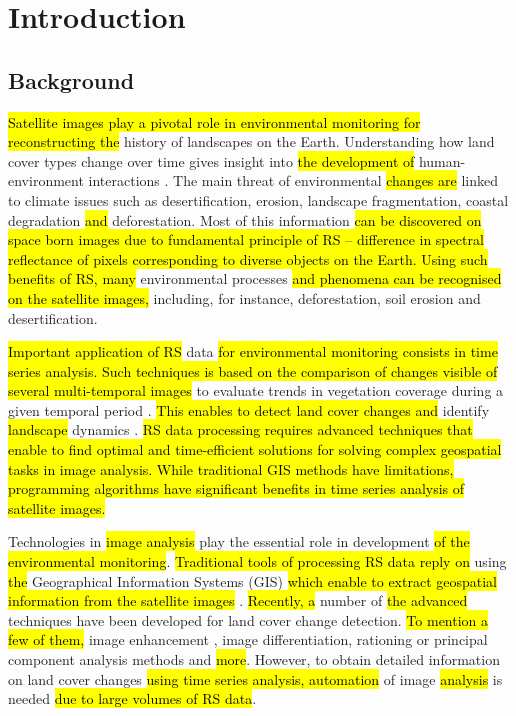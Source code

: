 \documentclass[jimaging,article,submit,pdftex,moreauthors]{Definitions/mdpi}
\begin{document}
\section{Introduction}

\subsection{Background}

\hl{Satellite images play a pivotal role in environmental monitoring for reconstructing the} history of landscapes\hl{ }\hl{ }on the Earth. Understanding how land cover types change over time gives\hl{ }insight into \hl{the development of }human-environment interactions \cite{Ndehedehe2022,Foli,Speranza}. The main threat of environmental \hl{changes are} linked to climate issues such as desertification, erosion, landscape fragmentation, coastal degradation \hl{and} deforestation. Most of this information \hl{can be discovered on space born images due to fundamental principle of RS -- difference in spectral reflectance of pixels corresponding to diverse objects on the Earth. Using such benefits of RS, many} environmental processes\hl{ and phenomena can be recognised on the satellite images,} including, for instance, deforestation, soil erosion and desertification. 

\hl{Important application of RS} data \hl{ for environmental monitoring consists in time series analysis. Such techniques is based on the comparison of changes visible of several multi-temporal images }to evaluate trends in vegetation coverage during a given temporal period \cite{Springer2023,10281679}. \hl{This enables to detect land cover changes and} identify \hl{landscape} dynamics \cite{su13084092,NATARAJAN2016256}. \hl{RS data processing requires advanced techniques that enable to find optimal and time-efficient solutions for solving complex geospatial tasks in image analysis. While traditional GIS methods have limitations, programming algorithms have significant benefits in time series analysis of satellite images.}

Technologies in \hl{image analysis} play the essential role in development \hl{of the environmental monitoring}. \hl{Traditional tools of processing RS data reply on} using \hl{the} Geographical Information Systems (GIS) \hl{which enable to extract geospatial information from the satellite images} \cite{BORANA2023261,Zhu02012021}. \hl{Recently, a} number of \hl{the advanced} techniques have been developed for land cover change detection. \hl{To mention a few of them,} image enhancement \cite{Dyson2024}, image differentiation, rationing or principal component analysis methods \cite{7877513} and \hl{more}. However, to obtain detailed information on land cover changes \hl{using time series analysis, automation} of image \hl{analysis} is needed \hl{due to large volumes of RS data}. 
\end{document}
